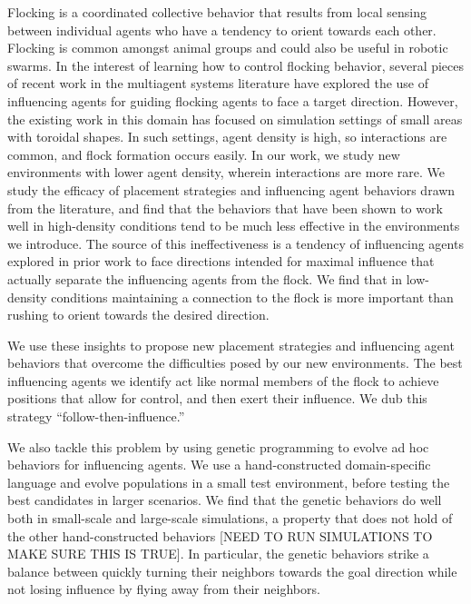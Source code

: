 
Flocking is a coordinated collective behavior that results from local sensing
between individual agents who have a tendency to orient towards each other.
Flocking is common amongst animal groups and could also be useful in robotic
swarms.
In the interest of learning how to control flocking behavior, several pieces
of recent work in the multiagent systems literature have explored the use of
influencing agents for guiding flocking agents to face a target direction.
However, the existing work in this domain has focused on simulation settings
of small areas with toroidal shapes.
In such settings, agent density is high, so interactions are common, and
flock formation occurs easily.
In our work, we study new environments with lower agent density, wherein
interactions are more rare.
We study the efficacy of placement strategies and influencing agent behaviors
drawn from the literature, and find that the behaviors that have been shown to
work well in high-density conditions tend to be much less effective in the
environments we introduce.
The source of this ineffectiveness is a tendency of influencing agents explored
in prior work to face directions intended for maximal influence that actually
separate the influencing agents from the flock.
We find that in low-density conditions maintaining a connection to the flock is
more important than rushing to orient towards the desired direction.

We use these insights to propose new placement strategies and influencing agent
behaviors that overcome the difficulties posed by our new environments.
The best influencing agents we identify act like normal members of the flock to
achieve positions that allow for control, and then exert their influence.  
We dub this strategy ``follow-then-influence.''

We also tackle this problem by using genetic programming to evolve ad hoc
behaviors for influencing agents.
We use a hand-constructed domain-specific language and evolve populations in
a small test environment, before testing the best candidates in larger
scenarios.
We find that the genetic behaviors do well both in small-scale and large-scale
simulations, a property that does not hold of the other hand-constructed
behaviors [NEED TO RUN SIMULATIONS TO MAKE SURE THIS IS TRUE].
In particular, the genetic behaviors strike a balance between quickly turning
their neighbors towards the goal direction while not losing influence by
flying away from their neighbors.

